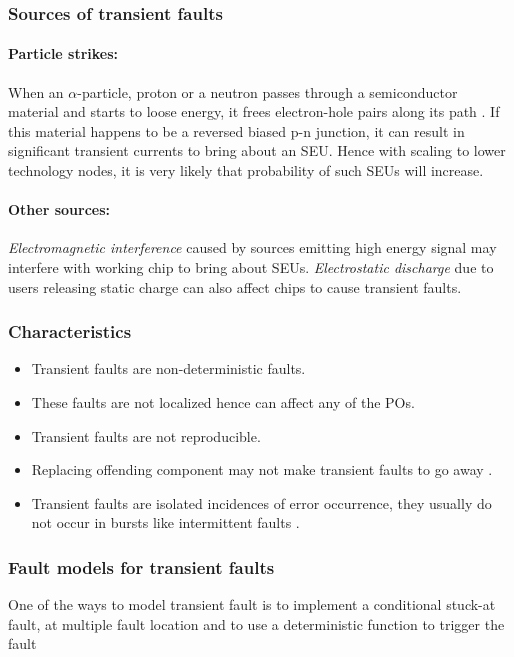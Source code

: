\subsubsection{Sources of transient faults}
\paragraph{Particle strikes:}When an $\alpha$-particle, proton or a neutron passes through a semiconductor material and starts to loose energy, it frees electron-hole pairs along its path \cite{Dodd2003}. If this material happens to be a reversed biased p-n junction, it can result in significant transient currents to bring about an SEU. Hence with scaling to lower technology nodes, it is very likely that probability of such SEUs will increase.

\paragraph{Other sources:} \emph{Electromagnetic interference} caused by sources emitting high energy signal may interfere with working chip to bring about SEUs. \emph{Electrostatic discharge} due to users releasing static charge can also affect chips to cause transient faults.

\subsubsection{Characteristics}
\begin{itemize}
	\item Transient faults are non-deterministic faults.
	\item These faults are not localized hence can affect any of the POs.
	\item Transient faults are not reproducible.
 	\item Replacing offending component may not make transient faults to go away \cite{Constantinescu2007}.
	\item Transient faults are isolated incidences of error occurrence, they usually do not occur in bursts like intermittent faults \cite{Constantinescu2007, Constantinescu2003}.
\end{itemize}

\subsubsection{Fault models for transient faults}
One of the ways  to model transient fault is to implement a conditional stuck-at fault, at multiple fault location and to use a deterministic function to trigger the fault \cite{Holst2009}


